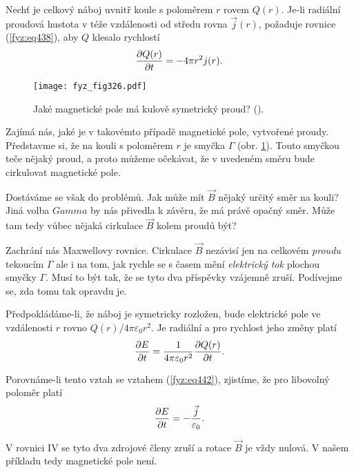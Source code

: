 {  Nechť je celkový náboj uvnitř koule s poloměrem \(r\) rovem \(Q(r)\). Je-li radiální proudová 
  hustota v téže vzdálenosti od středu rovna \(\vec{j}(r)\), požaduje rovnice (\ref{fyz:eq438}), 
  aby \(Q\) klesalo rychlostí
  \begin{equation}\label{fyz:eq442}
    \dfrac{\partial Q(r)}{\partial t} = - 4\pi r^2j(r).
  \end{equation}
  
  \begin{figure}[ht!]  %
    \centering
    \texttt{[image: fyz\_fig326.pdf]}
    \caption{Jaké magnetické pole má kulově symetrický proud?
             (\cite[s.~320]{Feynman02}).}
    \label{fyz:fig326}
  \end{figure}
  
  Zajímá nás, jaké je v takovémto případě magnetické pole, vytvořené proudy. Představme si, že na 
  kouli s poloměrem \(r\) je smyčka \(\Gamma\) (obr. \ref{fyz:fig326}). Touto smyčkou teče nějaký 
  proud, a proto můžeme očekávat, že v uvedeném směru bude cirkulovat magnetické pole.
  
  Dostáváme se však do problémů. Jak může mít \(\vec{B}\) nějaký určitý směr na kouli? Jiná volba 
  \(Gamma\) by nás přivedla k závěru, že má právě opačný směr. Může tam tedy vůbec nějaká cirkulace 
  \(\vec{B}\) kolem proudů být?
  
  Zachrání nás Maxwellovy rovnice. Cirkulace \(\vec{B}\) nezávisí jen na celkovém \emph{proudu} 
  tekoucím \(\Gamma\) ale i na tom, jak rychle se s časem mění \emph{elektrický tok} plochou smyčky 
  \(\Gamma\). Musí to být tak, že se tyto dva příspěvky vzájemně zruší. Podívejme se, zda tomu tak 
  opravdu je. 
  
  Předpokládáme-li, že náboj je symetricky rozložen, bude elektrické pole ve vzdálenosti \(r\) 
  rovno \(Q(r)/4\pi\varepsilon_0 r^2\). Je radiální a pro rychlost jeho změny platí
  \begin{equation}\label{fyz:eq443}
    \dfrac{\partial E}{\partial t} =  \frac{1}{4\pi\varepsilon_0 r^2}\dfrac{\partial Q(r)}{\partial t}.
  \end{equation}
  
  Porovnáme-li tento vztah se vztahem (\ref{fyz:eq442}), zjistíme, že pro libovolný poloměr platí
  \begin{equation}\label{fyz:eq444}
    \dfrac{\partial E}{\partial t} =  -\frac{\vec{j}}{\varepsilon_0}.
  \end{equation}
  
  V rovnici IV se tyto dva zdrojové členy zruší a rotace \(\vec{B}\) je vždy nulová. V našem 
  příkladu tedy magnetické pole není.
  
}
